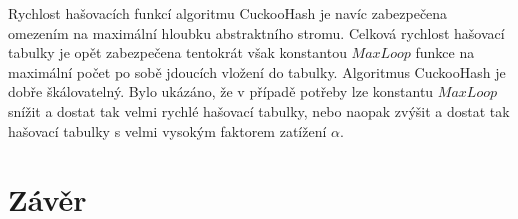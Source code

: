 Rychlost hašovacích funkcí algoritmu CuckooHash je navíc zabezpečena omezením na maximální hloubku abstraktního stromu. Celková rychlost hašovací tabulky
je opět zabezpečena tentokrát však konstantou $MaxLoop$ funkce na maximální počet po sobě jdoucích vložení do tabulky. Algoritmus CuckooHash je dobře škálovatelný.
Bylo ukázáno, že v případě potřeby lze konstantu $MaxLoop$ snížit a dostat tak velmi rychlé hašovací tabulky, nebo naopak zvýšit a dostat tak hašovací tabulky s velmi
vysokým faktorem zatížení $\alpha$.

\chapter{Závěr}


